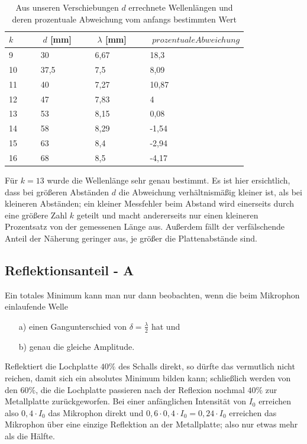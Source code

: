 \begin{table}
\centering
\begin{tabular}{l|l|l|l}
\(k\)	&~~~	\(d\) [mm]	&~~~	\(\lambda\) [mm]	&~~~	\(prozentuale Abweichung\)\\
\hline
9	&~~~	30	&~~~	6,67	&~~~	18,3\\
10	&~~~	37,5	&~~~	7,5	&~~~	8,09\\
11	&~~~	40	&~~~	7,27	&~~~	10,87\\
12	&~~~	47	&~~~	7,83	&~~~	4\\
13	&~~~	53	&~~~	8,15	&~~~	0,08\\
14	&~~~	58	&~~~	8,29	&~~~	-1,54\\
15	&~~~	63	&~~~	8,4	&~~~	-2,94\\
16	&~~~	68	&~~~	8,5	&~~~	-4,17\end{tabular}
\caption{Aus unseren Verschiebungen \(d\) errechnete Wellenlängen und deren prozentuale Abweichung vom anfangs bestimmten Wert}
\label{tab_lochplatte_wellenlaenge}
\end{table}

Für \(k = 13\) wurde die Wellenlänge sehr genau bestimmt. Es ist hier ersichtlich, dass bei größeren Abständen \(d\) die Abweichung verhältnismäßig kleiner ist, als bei kleineren Abständen; ein kleiner Messfehler beim Abstand wird einerseits durch eine größere Zahl \(k\) geteilt und macht andererseits nur einen kleineren Prozentsatz von der gemessenen Länge aus. Außerdem fällt der verfälschende Anteil der Näherung geringer aus, je größer die Plattenabstände sind.


\subsection{Reflektionsanteil - A}
\label{kap_reflektionsanteil01}


Ein totales Minimum kann man nur dann beobachten, wenn die beim Mikrophon einlaufende Welle 
\begin{enumerate}
   \item[a)] einen Gangunterschied von \(\delta = \frac{\lambda}{2}\) hat und 
   \item[b)] genau die gleiche Amplitude.
\end{enumerate}

Reflektiert die Lochplatte \(40\%\) des Schalls direkt, so dürfte das vermutlich nicht reichen, damit sich ein absolutes Minimum bilden kann; schließlich werden von den \(60\%\), die die Lochplatte passieren nach der Reflexion nochmal \(40\%\) zur Metallplatte zurückgeworfen. Bei einer anfänglichen Intensität von \(I_0\) erreichen also \(0,4 \cdot I_0\) das Mikrophon direkt und \(0,6 \cdot 0,4 \cdot I_0 = 0,24 \cdot I_0\) erreichen das Mikrophon über eine einzige Reflektion an der Metallplatte; also nur etwas mehr als die Hälfte.


